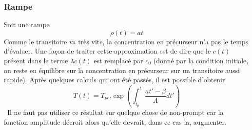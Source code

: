 \subsubsection{Rampe}
Soit une rampe
\begin{equation}
\rho(t) = at
\end{equation}
Comme le transitoire va très vite, la concentration en précurseur n'a pas le temps d'évaluer. Une 
façon de traiter cette approximation est de dire que le $c(t)$ présent dans le terme $\lambda c(t)$
est remplacé par $c_0$ (donné par la condition initiale, on reste en équilibre sur la concentration 
en précurseur sur un transitoire aussi rapide). Après quelques calculs qui ont été passés, il est 
possible d'obtenir
\begin{equation}
T(t) = {T_{pc}}.\exp \left( {\int_{{t_p}}^t   \frac{{at' - \beta }}{\Lambda }dt'} \right)
\end{equation}
\danger\ Il ne faut pas utiliser ce résultat sur quelque chose de non-prompt car la fonction 
amplitude décroit alors qu'elle devrait, dans ce cas la, augmenter.